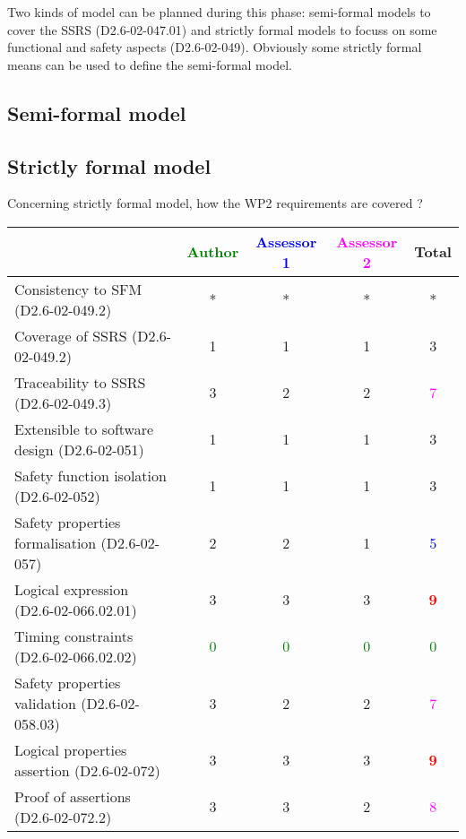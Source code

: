 Two kinds of model can be planned during this phase: semi-formal models to  cover the SSRS (D2.6-02-047.01) and strictly formal  models to  focuss on some functional and safety aspects (D2.6-02-049).  Obviously some strictly  formal means can be used to define the semi-formal  model.

\subsection{Semi-formal model}

\begin{comment}
Section has been skipped.
\end{comment}

\subsection{Strictly formal model}

Concerning strictly formal model, how the WP2 requirements are covered ?

\begin{tabular}{|l | c | c | c | c|}
\hline
& \textcolor{green}{Author} & \textcolor{blue}{Assessor 1} & \textcolor{magenta}{Assessor 2} & Total \\
\hline 
Consistency to SFM (D2.6-02-049.2) &* &* & *&  * \\
\hline
Coverage of SSRS (D2.6-02-049.2)  &1 &1 & 1    & 3      \\
\hline
Traceability to  SSRS (D2.6-02-049.3)  &3 &2 & 2    & \textcolor{magenta}{7} \\
\hline
Extensible to software design (D2.6-02-051)  &1 &1 & 1    & 3      \\
\hline
Safety function isolation (D2.6-02-052)  &1 &1 & 1    & 3     \\
\hline 
Safety properties formalisation (D2.6-02-057)  &2 &2 & 1    & \textcolor{blue}{5} \\
\hline
Logical expression (D2.6-02-066.02.01)  &3 &3 & 3    & \textcolor{red}{\textbf{9}} \\
\hline
Timing constraints (D2.6-02-066.02.02)  & \textcolor{green}{0}   & \textcolor{green}{0}   & \textcolor{green}{0} & \textcolor{green}{0} \\
\hline
Safety properties validation (D2.6-02-058.03)  &3 &2 & 2    & \textcolor{magenta}{7} \\
\hline
Logical properties assertion (D2.6-02-072)  &3 &3 & 3    & \textcolor{red}{\textbf{9}} \\
\hline
Proof of assertions (D2.6-02-072.2)  &3 &3 & 2    & \textcolor{magenta}{8} \\
\hline
\end{tabular}

